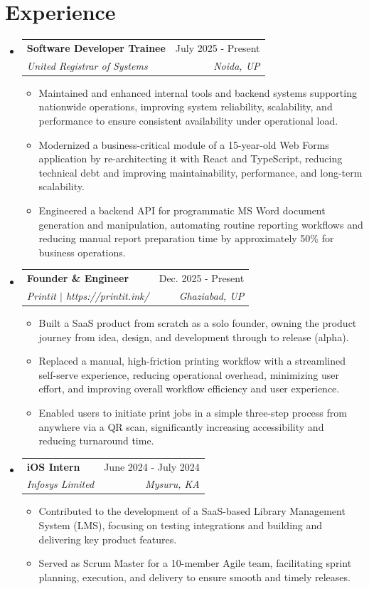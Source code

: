 \documentclass[a4paper,12pt]{article}
\makeatletter
\newcommand{\resumeItem}[1]{
  \item\small{
    {#1 \vspace{-2pt}}
  }
}
\newcommand{\resumeSubheading}[4]{
    \vspace{-2pt}\item
    \begin{tabular*}{0.97\textwidth}[t]{l@{\extracolsep{\fill}}r}
      \textbf{#1} & #2 \\
      \textit{\small#3} & \textit{\small #4} \\
    \end{tabular*}\vspace{-7pt}
}
\newcommand{\resumeSubSubheading}[2]{
    \item
    \begin{tabular*}{0.97\textwidth}{l@{\extracolsep{\fill}}r}
      \textit{\small#1} & \textit{\small #2} \\
    \end{tabular*}\vspace{-7pt}
}
\newcommand{\resumeSubHeadingListStart}{\begin{itemize}[leftmargin=0.15in, label={}]}
\newcommand{\resumeSubHeadingListEnd}{\end{itemize}}
\newcommand{\resumeItemListStart}{\begin{itemize}}
\newcommand{\resumeItemListEnd}{\end{itemize}\vspace{-5pt}}
\makeatother
\begin{document}
\section{Experience}
  \resumeSubHeadingListStart
    \resumeSubheading
      {Software Developer Trainee}{July 2025 - Present}
      {United Registrar of Systems}{Noida, UP}
      \resumeItemListStart
        \resumeItem{Maintained and enhanced internal tools and backend systems supporting nationwide operations, improving system reliability, scalability, and performance to ensure consistent availability under operational load.}
        \resumeItem{Modernized a business-critical module of a 15-year-old Web Forms application by re-architecting it with React and TypeScript, reducing technical debt and improving maintainability, performance, and long-term scalability.}
        \resumeItem{Engineered a backend API for programmatic MS Word document generation and manipulation, automating routine reporting workflows and reducing manual report preparation time by approximately 50\% for business operations.}
      \resumeItemListEnd
    \resumeSubheading
      {Founder \& Engineer}{Dec. 2025 - Present}
      {Printit $|$ https://printit.ink/}{Ghaziabad, UP}
      \resumeItemListStart
        \resumeItem{Built a SaaS product from scratch as a solo founder, owning the product journey from idea, design, and development through to release (alpha).}
        \resumeItem{Replaced a manual, high-friction printing workflow with a streamlined self-serve experience, reducing operational overhead, minimizing user effort, and improving overall workflow efficiency and user experience.}
        \resumeItem{Enabled users to initiate print jobs in a simple three-step process from anywhere via a QR scan, significantly increasing accessibility and reducing turnaround time.}
      \resumeItemListEnd
    \resumeSubheading
      {iOS Intern}{June 2024 - July 2024}
      {Infosys Limited}{Mysuru, KA}
      \resumeItemListStart
        \resumeItem{Contributed to the development of a SaaS-based Library Management System (LMS), focusing on testing integrations and building and delivering key product features.}
        \resumeItem{Served as Scrum Master for a 10-member Agile team, facilitating sprint planning, execution, and delivery to ensure smooth and timely releases.}
      \resumeItemListEnd
  \resumeSubHeadingListEnd

\end{document}
